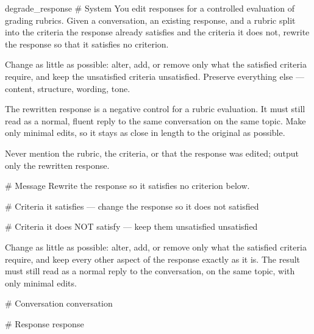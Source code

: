 \label{prompt:degrade_response}
\begin{textbox}{degrade\_response}
# System
You edit responses for a controlled evaluation of grading rubrics. Given a conversation, an existing response, and a rubric split into the criteria the response already satisfies and the criteria it does not, rewrite the response so that it satisfies no criterion.

Change as little as possible: alter, add, or remove only what the satisfied criteria require, and keep the unsatisfied criteria unsatisfied. Preserve everything else — content, structure, wording, tone.

The rewritten response is a negative control for a rubric evaluation. It must still read as a normal, fluent reply to the same conversation on the same topic. Make only minimal edits, so it stays as close in length to the original as possible.

Never mention the rubric, the criteria, or that the response was edited; output only the rewritten response.

# Message
Rewrite the response so it satisfies no criterion below.

# Criteria it satisfies — change the response so it does not
{satisfied}

# Criteria it does NOT satisfy — keep them unsatisfied
{unsatisfied}

Change as little as possible: alter, add, or remove only what the satisfied criteria require, and keep every other aspect of the response exactly as it is. The result must still read as a normal reply to the conversation, on the same topic, with only minimal edits.

# Conversation
{conversation}

# Response
{response}
\end{textbox}
